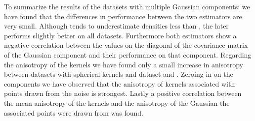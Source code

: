 	To summarize the results of the datasets with multiple Gaussian components: we have found that the differences in performance between the two estimators are very small. Although \sambe tends to underestimate densities less than \mbe, the later performs slightly better on all datasets.
	Furthermore both estimators show a negative correlation between the values on the diagonal of the covariance matrix of the Gaussian component and their performance on that component.
	Regarding the anisotropy of the kernels we have found only a small increase in anisotropy between datasets with spherical kernels and dataset \baakmanTwo and \baakmanThree. 
	Zeroing in on the components we have observed that the anisotropy of kernels associated with points drawn from the noise is strongest.
	Lastly a positive correlation between the mean anisotropy of the kernels and the anisotropy of the Gaussian the associated points were drawn from was found. 